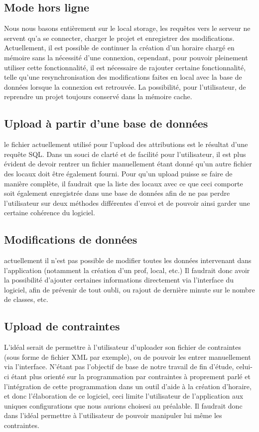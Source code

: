 \subsection{Mode hors ligne}
Nous nous basons entièrement sur le local storage, les requêtes vers le serveur ne 
servent qu'a se connecter, charger le projet et enregistrer des modifications.
Actuellement, il est possible de continuer la création d'un horaire chargé en 
mémoire sans la nécessité d'une connexion, cependant, pour pouvoir pleinement 
utiliser cette fonctionnalité, il est nécessaire de rajouter certaine fonctionnalité, telle 
qu'une resynchronisation des modifications faites en local avec la base de données lorsque la 
connexion est retrouvée. La possibilité, pour l'utilisateur, de reprendre un projet toujours conservé dans la mémoire cache.

\subsection{Upload à partir d'une base de données}
le fichier actuellement utilisé pour l'upload des attributions est le résultat d'une requête SQL. Dans un souci de clarté et de facilité pour l'utilisateur, il est plus évident de devoir rentrer un fichier manuellement étant donné qu'un autre fichier des locaux doit être également fourni. Pour qu'un upload puisse se faire de manière complète, il faudrait que la liste des locaux avec ce que ceci comporte soit également enregistrée dans une base de données afin de ne pas perdre l'utilisateur sur deux méthodes différentes d'envoi et de pouvoir ainsi garder une certaine cohérence du logiciel.

\subsection{Modifications de données}
actuellement il n'est pas possible de modifier toutes les données intervenant 
dans l'application (notamment la création d'un prof, local, etc.) Il faudrait donc avoir la possibilité d'ajouter certaines informations directement via l'interface du logiciel, afin de prévenir de tout oubli, ou rajout de dernière minute sur le nombre de classes, etc.

\subsection{Upload de contraintes}
L'idéal serait de permettre à l'utilisateur d'uploader son fichier de contraintes (sous forme de fichier XML par exemple), ou de pouvoir les entrer manuellement via l'interface. N'étant pas l'objectif de base de notre travail de fin d'étude, celui-ci étant plus orienté sur la programmation par contraintes à proprement parlé et l'intégration de cette programmation dans un outil d'aide à la création d'horaire, et donc l'élaboration de ce logiciel, ceci limite l'utilisateur de l'application aux uniques configurations que nous aurions choisesi au préalable. Il faudrait donc dans l'idéal permettre à l'utilisateur de pouvoir manipuler lui même les contraintes.